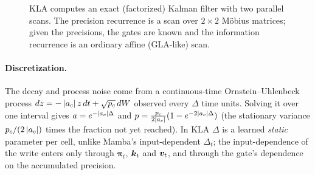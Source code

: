 \begin{figure}[t]
\centering
{}
\caption{KLA computes an exact (factorized) Kalman filter with two parallel scans. The precision
recurrence is a scan over $2\times2$ M\"obius matrices; given the precisions, the gates are known
and the information recurrence is an ordinary affine (GLA-like) scan.}
\label{fig:c08-kla}
\end{figure}

\paragraph{Discretization.} The decay and process noise come from a continuous-time
Ornstein--Uhlenbeck process $dz=-\left\lvert a_c\right\rvert z\,dt+\sqrt{p_c}\,dW$ observed every $\Delta$ time units.
Solving it over one interval gives $a=e^{-\left\lvert a_c\right\rvert\Delta}$ and
$p=\frac{p_c}{2\left\lvert a_c\right\rvert}(1-e^{-2\left\lvert a_c\right\rvert\Delta})$ (the stationary variance $p_c/(2\left\lvert a_c\right\rvert)$
times the fraction not yet reached). In KLA $\Delta$ is a learned \emph{static} parameter per cell,
unlike Mamba's input-dependent $\Delta_t$; the input-dependence of the write enters only through
$\bm{\pi}_t$, $\bm{k}_t$ and $\bm{v}_t$, and through the gate's dependence on the accumulated precision.


